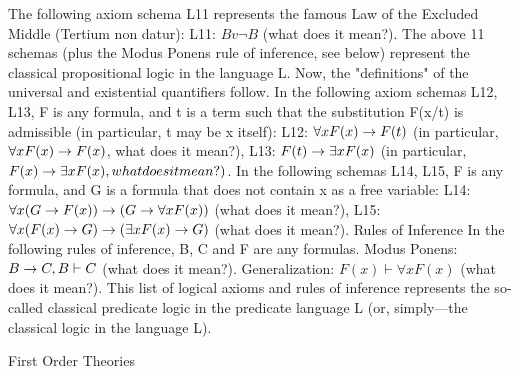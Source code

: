 The following axiom schema L11 represents the famous Law of the Excluded Middle (Tertium non
datur):
L11: \(Bv\neg B\) (what does it mean?).
The above 11 schemas (plus the Modus Ponens rule of inference, see below) represent the classical
propositional logic in the language L.
Now, the "definitions" of the universal and existential quantifiers follow.
In the following axiom schemas L12, L13, F is any formula, and t is a term such that the substitution F(x/t)
is admissible (in particular, t may be x itself):
L12: \(\forall xF(x)\rightarrow F(t)\) (in particular, \(\forall xF(x)\rightarrow F(x)\), what does it mean?),
L13: \(F(t)\rightarrow \exists xF(x)\) (in particular, \(F(x)\rightarrow \exists xF(x), what does it mean?)\).
In the following schemas L14, L15, F is any formula, and G is a formula that does not contain x as a free
variable:
L14: \(\forall x(G\rightarrow F(x))\rightarrow (G\rightarrow \forall xF(x))\) (what does it mean?),
L15: \(\forall x(F(x)\rightarrow G)\rightarrow (\exists xF(x)\rightarrow G)\) (what does it mean?).
Rules of Inference
In the following rules of inference, B, C and F are any formulas.
Modus Ponens: \(B\rightarrow C, B \vdash C\) (what does it mean?).
Generalization: \(F(x) \vdash \forall xF(x)\) (what does it mean?).
This list of logical axioms and rules of inference represents the so-called classical predicate logic in the
predicate language L (or, simply---the classical logic in the language L).

First Order Theories

